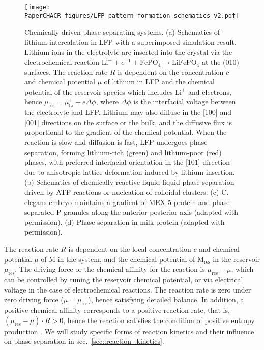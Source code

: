 \documentclass[reprint,aps,pre,superscriptaddress]{revtex4-2}
\begin{document}
\begin{figure}
    \centering
    \texttt{[image: PaperCHACR\_figures/LFP\_pattern\_formation\_schematics\_v2.pdf]}
    \caption{Chemically driven phase-separating systems. (a) Schematics of lithium intercalation in LFP with a superimposed simulation result. Lithium ions in the electrolyte are inserted into the crystal via the electrochemical reaction $\text{Li}^+ + e^{-1} + \text{FePO}_4 \rightarrow \text{LiFePO}_4$ at the (010) surfaces. The reaction rate $R$ is dependent on the concentration $c$ and chemical potential $\mu$ of lithium in LFP and the chemical potential of the reservoir species which includes $\text{Li}^+$ and electrons, hence $\mu_\text{res} = \mu_\text{Li}^+ - e\Delta \phi$, where $\Delta \phi$ is the interfacial voltage between the electrolyte and LFP. Lithium may also diffuse in the [100] and [001] directions on the surface or the bulk, and the diffusive flux is proportional to the gradient of the chemical potential. When the reaction is slow and diffusion is fast, LFP undergoes phase separation, forming lithium-rich (green) and lithium-poor (red) phases, with preferred interfacial orientation in the [101] direction due to anisotropic lattice deformation induced by lithium insertion. (b) Schematics of chemically reactive liquid-liquid phase separation driven by ATP reactions or nucleation of colloidal clusters. (c) C. elegans embryo maintains a gradient of MEX-5 protein and phase-separated P granules along the anterior-posterior axis \cite{Saha2016} (adapted with permission). (d) Phase separation in milk protein \cite{deBont2002} (adapted with permission).}
    \label{fig::schematics}
\end{figure}

The reaction rate $R$ is dependent on the local concentration $c$ and chemical potential $\mu$ of M in the system, and the chemical potential of $\text{M}_\text{res}$ in the reservoir $\mu_\text{res}$. The driving force or the chemical affinity for the reaction is $\mu_\text{res}-\mu$, which can be controlled by tuning the reservoir chemical potential, or via electrical voltage in the case of electrochemical reactions. The reaction rate is zero under zero driving force ($\mu=\mu_\text{res}$), hence satisfying detailed balance. In addition, a positive chemical affinity corresponds to a positive reaction rate, that is, $(\mu_\text{res}-\mu)\cdot R>0$, hence the reaction satisfies the condition of positive entropy production \cite{Bazant2017}. We will study specific forms of reaction kinetics and their influence on phase separation in sec.~\ref{sec::reaction_kinetics}.
\end{document}
